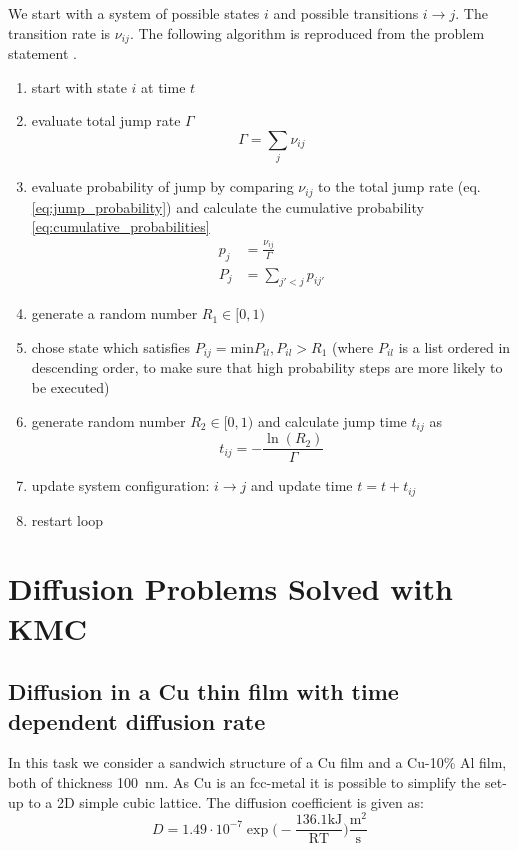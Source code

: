 We start with a system of possible states \(i\) and possible transitions \(i \rightarrow j\). The transition rate is \(\nu_{ij}\). The following algorithm is reproduced from the problem statement \cite{zaiserb}.

\begin{enumerate}
	\item start with state \(i\) at time \(t\)
	\item evaluate total jump rate $\Gamma$ \begin{equation}
		\Gamma = \sum\limits_{j}\nu_{ij} \label{eq:total_jump_rate}
	\end{equation} 
	\item evaluate probability of jump by comparing \( \nu_{ij} \) to the total jump rate (eq. \ref{eq:jump_probability}) and calculate the cumulative probability \ref{eq:cumulative_probabilities} 
	\begin{subequations}
		\begin{align}
			p_{j} & = \frac{\nu_{ij}}{\Gamma} \label{eq:jump_probability} \\
			 P_{j }&= \sum\limits_{j'<j}p_{ij'} \label{eq:cumulative_probabilities}
		\end{align}
	\end{subequations} 
	\item generate a random number \(R_{1} \in [0,1)\)
	\item chose state which satisfies \( P_{ij} = \mathrm{min}{P_{il}, P_{il} > R_{1}}\) (where \(P_{il}\) is a list ordered in descending order, to make sure that high probability steps are more likely to be executed)
	\item generate random number \(R_{2} \in [0,1)\) and calculate jump time \(t_{ij}\) as
	\begin{equation}
		t_{ij} = - \frac{\ln(R_{2})}{\Gamma}
	\end{equation}
	\item update system configuration: \(i \rightarrow j\) and update time \(t = t + t_{ij}\)
	\item restart loop

\end{enumerate} 

\section{Diffusion Problems Solved with KMC}
\subsection{Diffusion in a Cu thin film with time dependent diffusion rate}
In this task we consider a sandwich structure of a Cu film and a Cu-10\% Al film, both of thickness 100~nm. As Cu is an fcc-metal it is possible to simplify the set-up to a 2D simple cubic lattice. The diffusion coefficient is given as:
\begin{equation}
	D = 1.49 \cdot 10^{-7} \exp \bigl( - \frac{136.1 \mathrm{kJ}}{\mathrm{R T}}   \bigr) \frac{\mathrm{m}^{2}}{\mathrm{s}}
\end{equation}

